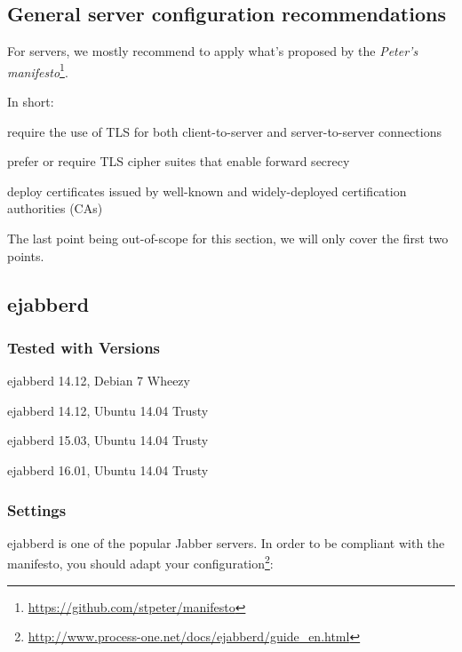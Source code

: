 \gdef\currentsectionname{IM}
\subsection{General server configuration recommendations}

For servers, we mostly recommend to apply what's proposed by the \emph{Peter's manifesto}\footnote{\url{https://github.com/stpeter/manifesto}}.

In short:
\begin{itemize*}
    \item require the use of TLS for both client-to-server and server-to-server connections
    \item prefer or require TLS cipher suites that enable forward secrecy
    \item deploy certificates issued by well-known and widely-deployed certification authorities (CAs)
\end{itemize*}

The last point being out-of-scope for this section, we will only cover the first two points.

\subsection{ejabberd}

\subsubsection{Tested with Versions}
\begin{itemize*}
  \item ejabberd 14.12, Debian 7 Wheezy
  \item ejabberd 14.12, Ubuntu 14.04 Trusty
  \item ejabberd 15.03, Ubuntu 14.04 Trusty
  \item ejabberd 16.01, Ubuntu 14.04 Trusty
\end{itemize*}

\subsubsection{Settings}
ejabberd is one of the popular Jabber servers. In order to be compliant
with the manifesto, you should adapt your configuration\footnote{\url{http://www.process-one.net/docs/ejabberd/guide_en.html}}:

% 
